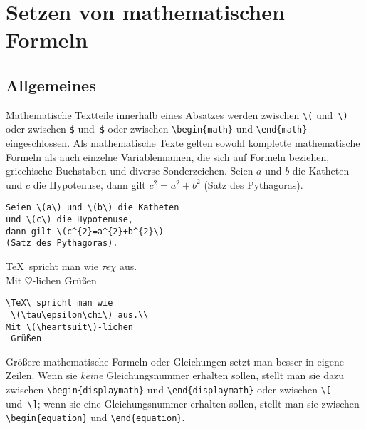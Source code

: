 
\section{Setzen von mathematischen Formeln} \label{math}
 
\subsection{Allgemeines}
 
Mathematische Textteile innerhalb eines Absatzes werden zwischen
\verb|\(| und~\verb|\)| oder zwischen \verb|$| und~\verb|$| oder
zwischen \verb|\begin{math}| und \verb|\end{math}|
eingeschlossen.
Als mathematische Texte gelten sowohl komplette mathematische
Formeln als auch einzelne Variablennamen, die sich auf Formeln
beziehen, griechische Buchstaben und diverse Sonderzeichen.
\exa
Seien \(a\) und \(b\) die Katheten
und \(c\) die Hypotenuse,
dann gilt \(c^{2}=a^{2}+b^{2}\)
(Satz des Pythagoras).
\exb
\begin{verbatim}
Seien \(a\) und \(b\) die Katheten
und \(c\) die Hypotenuse,
dann gilt \(c^{2}=a^{2}+b^{2}\)
(Satz des Pythagoras).
\end{verbatim}
\exc
\exa
\TeX\ spricht man wie
 \(\tau\epsilon\chi\) aus.\\[6pt]
Mit \(\heartsuit\)-lichen
 Grüßen
\exb
\begin{verbatim}
\TeX\ spricht man wie
 \(\tau\epsilon\chi\) aus.\\
Mit \(\heartsuit\)-lichen
 Grüßen
\end{verbatim}
\exc
 
Größere mathematische Formeln oder Gleichungen setzt man besser
in eigene Zeilen. Wenn sie \emph{keine} Gleichungsnummer erhalten 
sollen, stellt man sie dazu zwischen \verb|\begin{displaymath}| und
\verb|\end{displaymath}| oder zwischen \verb|\[| und~\verb|\]|; 
wenn sie eine Gleichungsnummer erhalten sollen, stellt man sie
zwischen \verb|\begin{equation}| und \verb|\end{equation}|.

